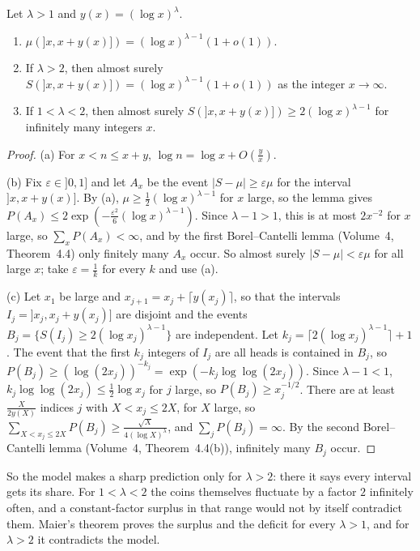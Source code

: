 \begin{proposition}\label{prop:cramershort}
Let $\lambda>1$ and $y(x)=(\log x)^\lambda$.
\begin{enumerate}[label=(\alph*)]
\item $\mu(]x,x+y(x)])=(\log x)^{\lambda-1}(1+o(1))$.
\item If $\lambda>2$, then almost surely $S(]x,x+y(x)])=(\log x)^{\lambda-1}(1+o(1))$ as the integer $x\to\infty$.
\item If $1<\lambda<2$, then almost surely $S(]x,x+y(x)])\ge2(\log x)^{\lambda-1}$ for infinitely many integers $x$.
\end{enumerate}
\end{proposition}
\begin{proof}
(a) For $x<n\le x+y$, $\log n=\log x+O(\frac yx)$.

(b) Fix $\varepsilon\in]0,1]$ and let $A_x$ be the event $|S-\mu|\ge\varepsilon\mu$ for the interval $]x,x+y(x)]$. By (a), $\mu\ge\frac12(\log x)^{\lambda-1}$ for $x$ large, so the lemma gives $P(A_x)\le2\exp(-\frac{\varepsilon^2}6(\log x)^{\lambda-1})$. Since $\lambda-1>1$, this is at most $2x^{-2}$ for $x$ large, so $\sum_xP(A_x)<\infty$, and by the first Borel--Cantelli lemma (Volume~4, Theorem~4.4) only finitely many $A_x$ occur. So almost surely $|S-\mu|<\varepsilon\mu$ for all large $x$; take $\varepsilon=\frac1k$ for every $k$ and use (a).

(c) Let $x_1$ be large and $x_{j+1}=x_j+\lceil y(x_j)\rceil$, so that the intervals $I_j=]x_j,x_j+y(x_j)]$ are disjoint and the events $B_j=\{S(I_j)\ge2(\log x_j)^{\lambda-1}\}$ are independent. Let $k_j=\lceil2(\log x_j)^{\lambda-1}\rceil+1$. The event that the first $k_j$ integers of $I_j$ are all heads is contained in $B_j$, so $P(B_j)\ge(\log(2x_j))^{-k_j}=\exp(-k_j\log\log(2x_j))$. Since $\lambda-1<1$, $k_j\log\log(2x_j)\le\frac12\log x_j$ for $j$ large, so $P(B_j)\ge x_j^{-1/2}$. There are at least $\frac{X}{2y(X)}$ indices $j$ with $X<x_j\le2X$, for $X$ large, so $\sum_{X<x_j\le2X}P(B_j)\ge\frac{\sqrt X}{4(\log X)^\lambda}$, and $\sum_jP(B_j)=\infty$. By the second Borel--Cantelli lemma (Volume~4, Theorem~4.4(b)), infinitely many $B_j$ occur.
\end{proof}

So the model makes a sharp prediction only for $\lambda>2$: there it says every interval gets its share. For $1<\lambda<2$ the coins themselves fluctuate by a factor $2$ infinitely often, and a constant-factor surplus in that range would not by itself contradict them. Maier's theorem proves the surplus and the deficit for every $\lambda>1$, and for $\lambda>2$ it contradicts the model.

